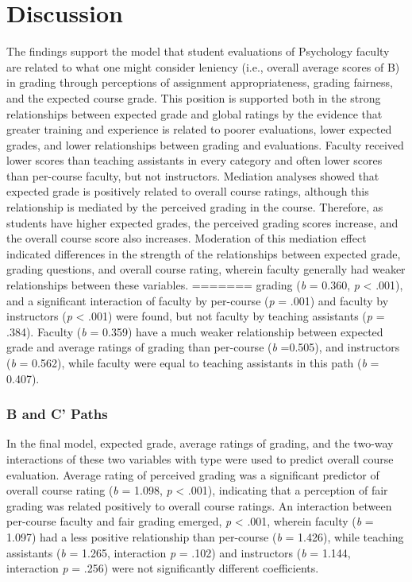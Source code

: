 \documentclass[,man]{apa6}
\theoremstyle{definition}
\theoremstyle{definition}
\theoremstyle{definition}
\theoremstyle{remark}
\begin{document}
\section{Discussion}\label{discussion}

The findings support the model that student evaluations of Psychology
faculty are related to what one might consider leniency (i.e., overall
average scores of B) in grading through perceptions of assignment
appropriateness, grading fairness, and the expected course grade. This
position is supported both in the strong relationships between expected
grade and global ratings by the evidence that greater training and
experience is related to poorer evaluations, lower expected grades, and
lower relationships between grading and evaluations. Faculty received
lower scores than teaching assistants in every category and often lower
scores than per-course faculty, but not instructors. Mediation analyses
showed that expected grade is positively related to overall course
ratings, although this relationship is mediated by the perceived grading
in the course. Therefore, as students have higher expected grades, the
perceived grading scores increase, and the overall course score also
increases. Moderation of this mediation effect indicated differences in
the strength of the relationships between expected grade, grading
questions, and overall course rating, wherein faculty generally had
weaker relationships between these variables.
=======
grading (\emph{b} = 0.360, \emph{p} \textless{} .001), and a significant
interaction of faculty by per-course (\emph{p} = .001) and faculty by
instructors (\emph{p} \textless{} .001) were found, but not faculty by
teaching assistants (\emph{p} = .384). Faculty (\emph{b} = 0.359) have a
much weaker relationship between expected grade and average ratings of
grading than per-course (\emph{b} =0.505), and instructors (\emph{b} =
0.562), while faculty were equal to teaching assistants in this path
(\emph{b} = 0.407).

\hypertarget{b-and-c-paths}{%
\subsubsection{B and C' Paths}\label{b-and-c-paths}}

In the final model, expected grade, average ratings of grading, and the
two-way interactions of these two variables with type were used to
predict overall course evaluation. Average rating of perceived grading
was a significant predictor of overall course rating (\emph{b} = 1.098,
\emph{p} \textless{} .001), indicating that a perception of fair grading
was related positively to overall course ratings. An interaction between
per-course faculty and fair grading emerged, \emph{p} \textless{} .001,
wherein faculty (\emph{b} = 1.097) had a less positive relationship than
per-course (\emph{b} = 1.426), while teaching assistants (\emph{b} =
1.265, interaction \emph{p} = .102) and instructors (\emph{b} = 1.144,
interaction \emph{p} = .256) were not significantly different
coefficients.
\end{document}
